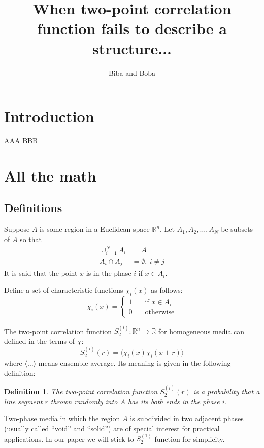 \documentclass[12pt, a4paper]{article}
\newtheorem{definition}{Definition}
\begin{document}
\title{When two-point correlation function fails to describe a structure...}
\author{Biba and Boba}
\maketitle

\section{Introduction}
AAA BBB

\section{All the math}
\subsection{Definitions}
Suppose $A$ is some region in a Euclidean space $\mathbb{R}^n$. Let
$A_1, A_2, \dots, A_N$ be subsets of $A$ so that
\begin{align*}
  \cup_{i=1}^N A_i &= A \\
  A_i \cap A_j &= \emptyset, \ i \ne j
\end{align*}
It is said that the point $x$ is in the phase $i$ if $x \in A_i$.

Define a set of characteristic functions $\chi_i(x)$ as follows:
\begin{equation*}
  \chi_i(x) = \left\{
  \begin{array}{ll}
    1 & \quad \text{if $x \in A_i$} \\
    0 & \quad \text{otherwise}
  \end{array}
  \right.
\end{equation*}

The two-point correlation function
$S_2^{(i)}: \mathbb{R}^n \rightarrow \mathbb{R}$ for homogeneous media can
defined in the terms of $\chi$:
\begin{equation}
  S_2^{(i)}(r) = \langle \chi_i(x) \chi_i(x+r) \rangle
  \label{eq:s2}
\end{equation}
where $\langle \dots \rangle$ means ensemble average. Its meaning is given in
the following definition:
\begin{definition}
  The two-point correlation function $S_2^{(i)}(r)$ is a probability that a
  line segment $r$ thrown randomly into $A$ has its both ends in the phase $i$.
  \label{def:s2}
\end{definition}

Two-phase media in which the region $A$ is subdivided in two adjacent phases
(usually called ``void'' and ``solid'') are of special interest for practical
applications. In our paper we will stick to $S_2^{(1)}$ function for simplicity.
\end{document}
